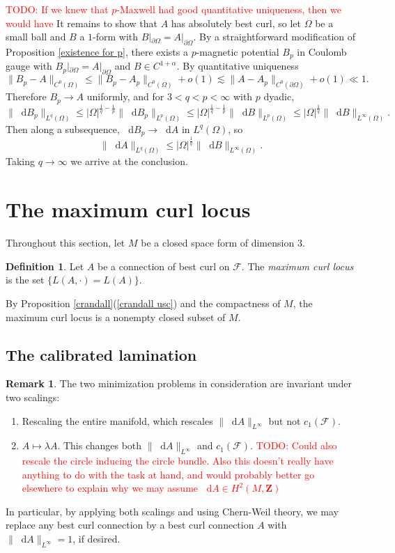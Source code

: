 \documentclass[reqno,11pt]{amsart}
\newcommand{\ZZ}{\mathbf{Z}}
\newcommand*\dif{\mathop{}\!\mathrm{d}}
\newcommand{\dfn}[1]{\emph{#1}\index{#1}}
\theoremstyle{definition}
\newtheorem{definition}[theorem]{Definition}
\newtheorem{remark}[theorem]{Remark}
\numberwithin{equation}{section}
\newcommand\todo[1]{\textcolor{red}{TODO: #1}}
\begin{document}
\todo{If we knew that $p$-Maxwell had good quantitative uniqueness, then we would have}
It remains to show that $A$ has absolutely best curl, so let $\Omega$ be a small ball and $B$ a $1$-form with $B|_{\partial \Omega} = A|_{\partial \Omega}$.
By a straightforward modification of Proposition \ref{existence for p}, there exists a $p$-magnetic potential $B_p$ in Coulomb gauge with $B_p|_{\partial \Omega} = A|_{\partial \Omega}$ and $B \in C^{1 + \alpha}$.
By quantitative uniqueness
$$\|B_p - A\|_{C^0(\Omega)} \leq \|B_p - A_p\|_{C^0(\Omega)} + o(1) \lesssim \|A - A_p\|_{C^0(\partial \Omega)} + o(1) \ll 1.$$
Therefore $B_p \to A$ uniformly, and for $3 < q < p < \infty$ with $p$ dyadic,
$$\|\dif B_p\|_{L^q(\Omega)} \leq |\Omega|^{\frac{1}{q} -\frac{1}{p}} \|\dif B_p\|_{L^p(\Omega)} \leq |\Omega|^{\frac{1}{q} -\frac{1}{p}} \|\dif B\|_{L^p(\Omega)} \leq |\Omega|^{\frac{1}{q}} \|\dif B\|_{L^\infty(\Omega)}.$$
Then along a subsequence, $\dif B_p \to \dif A$ in $L^q(\Omega)$, so 
$$\|\dif A\|_{L^q(\Omega)} \leq |\Omega|^{\frac{1}{q}} \|\dif B\|_{L^\infty(\Omega)}.$$
Taking $q \to \infty$ we arrive at the conclusion.


\section{The maximum curl locus}
Throughout this section, let $M$ be a closed space form of dimension $3$.

\begin{definition}
Let $A$ be a connection of best curl on $\mathscr F$.
The \dfn{maximum curl locus} is the set $\{L(A, \cdot) = L(A)\}$.
\end{definition}

By Proposition \ref{crandall}(\ref{crandall usc}) and the compactness of $M$, the maximum curl locus is a nonempty closed subset of $M$.

\subsection{The calibrated lamination}
\begin{remark}\label{scalings}
The two minimization problems in consideration are invariant under two scalings: 
\begin{enumerate}
\item Rescaling the entire manifold, which rescales $\|\dif A\|_{L^\infty}$ but not $c_1(\mathscr F)$.
\item $A \mapsto \lambda A$. This changes both $\|\dif A\|_{L^\infty}$ and $c_1(\mathscr F)$. \todo{Could also rescale the circle inducing the circle bundle. Also this doesn't really have anything to do with the task at hand, and would probably better go elsewhere to explain why we may assume $\dif A \in H^2(M, \ZZ)$}
\end{enumerate}
In particular, by applying both scalings and using Chern-Weil theory, we may replace any best curl connection by a best curl connection $A$ with $\|\dif A\|_{L^\infty} = 1$, if desired.
\end{remark}
\end{document}
